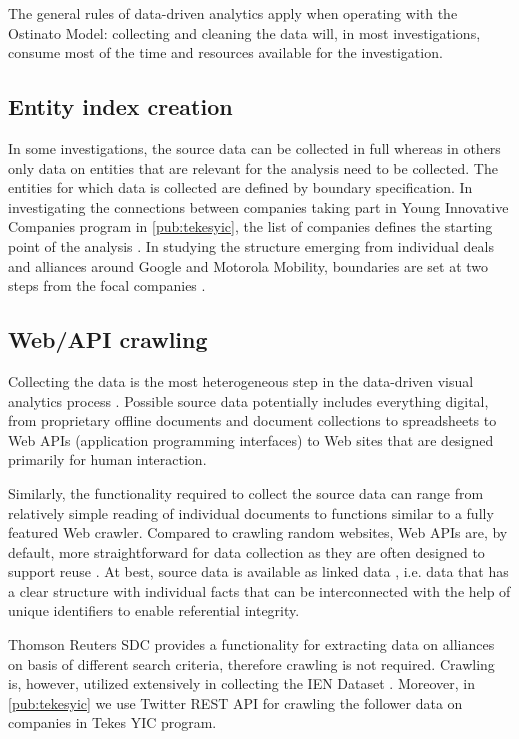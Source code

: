 The general rules of data-driven analytics apply when operating with the Ostinato Model: collecting and cleaning the data will, in most investigations, consume most of the time and resources available for the investigation.

\subsection{Entity index creation}

In some investigations, the source data can be collected in full whereas in others only data on entities that are relevant for the analysis need to be collected. The entities for which data is collected are defined by boundary specification. In investigating the connections between companies taking part in Young Innovative Companies program in \ref{pub:tekesyic}, the list of companies defines the starting point of the analysis \citep{Huhtamaki2012NetworksFinland}. In studying the structure emerging from individual deals and alliances around Google and Motorola Mobility, boundaries are set at two steps from the focal companies \citep{Basole2012UnderstandingApproach}.

\subsection{Web/API crawling}

Collecting the data is the most heterogeneous step in the data-driven visual analytics process \citep[cf.][]{Salonen2013ChallengesMedia}. Possible source data potentially includes everything digital, from proprietary offline documents and document collections to spreadsheets to Web APIs (application programming interfaces) to Web sites that are designed primarily for human interaction. 

Similarly, the functionality required to collect the source data can range from relatively simple reading of individual documents to functions similar to a fully featured Web crawler. Compared to crawling random websites, Web APIs are, by default, more straightforward for data collection as they are often designed to support reuse \citep{Vinoski2008}. At best, source data is available as linked data \citep{Bizer2009}, i.e. data that has a clear structure with individual facts that can be interconnected with the help of unique identifiers to enable referential integrity. 

Thomson Reuters SDC provides a functionality for extracting data on alliances on basis of different search criteria, therefore crawling is not required. Crawling is, however, utilized extensively in collecting the IEN Dataset \citep[see][]{Rubens2010LeveragingMoves}. Moreover, in \ref{pub:tekesyic} we use Twitter REST API for crawling the follower data on companies in Tekes YIC program.

